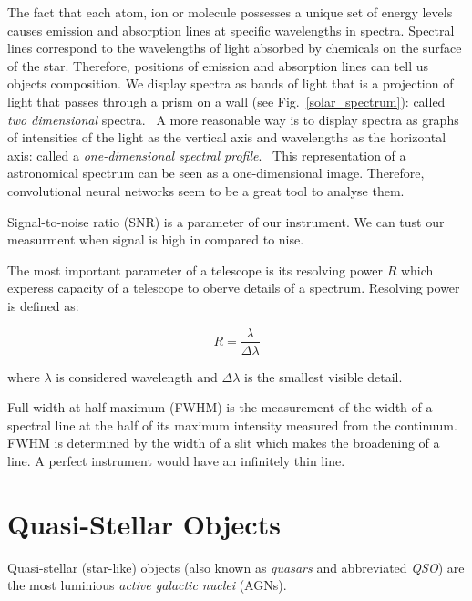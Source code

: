 The fact that each atom, ion or molecule possesses a unique set of energy levels
causes emission and absorption lines at specific wavelengths in spectra.
Spectral lines correspond to the wavelengths of light absorbed by chemicals on the surface of the star.
Therefore, positions of emission and absorption lines can tell us objects composition.
We display spectra as bands of light that is a projection of light that passes through a prism on a wall
(see Fig.~\ref{solar_spectrum}):
called \textit{two dimensional} spectra.~\cite{cochard2018}
A more reasonable way is to display spectra as graphs of intensities of the light as the vertical axis and wavelengths as the horizontal axis:
called a \textit{one-dimensional spectral profile}.~\cite{cochard2018}
This representation of a astronomical spectrum can be seen as a one-dimensional image.
Therefore, convolutional neural networks seem to be a great tool to analyse them.~\cite{bennett2005}

Signal-to-noise ratio (SNR) is a parameter of our instrument.
We can tust our measurment when signal is high in compared to nise.~\cite{cochard2018}

The most important parameter of a telescope is its resolving power \(R\)
which experess capacity of a telescope to oberve details of a spectrum.
Resolving power is defined as:

\begin{equation}
	R = \frac{\lambda}{\Delta \lambda}
\end{equation}

where \(\lambda\) is considered wavelength
and \(\Delta \lambda\) is the smallest visible detail.

Full width at half maximum (FWHM) is the measurement of the width of a spectral line
at the half of its maximum intensity measured from the continuum.
FWHM is determined by the width of a slit which makes the broadening of a line.
A perfect instrument would have an infinitely thin line.

\section{Quasi-Stellar Objects}

Quasi-stellar (star-like) objects (also known as \textit{quasars} and abbreviated \textit{QSO}) are the most luminious \textit{active galactic nuclei} (AGNs).~\cite{beckmann2013}

